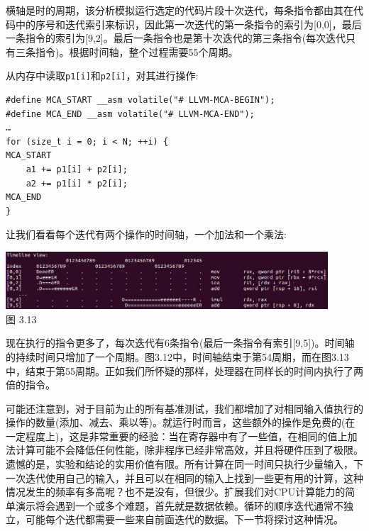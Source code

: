 横轴是时的周期，该分析模拟运行选定的代码片段十次迭代，每条指令都由其在代码中的序号和迭代索引来标识，因此第一次迭代的第一条指令的索引为[0,0]，最后一条指令的索引为[9,2]。最后一条指令也是第十次迭代的第三条指令(每次迭代只有三条指令)。根据时间轴，整个过程需要55个周期。

从内存中读取\texttt{p1[i]}和\texttt{p2[i]}，对其进行操作:

\begin{lstlisting}[style=styleCXX]
#define MCA_START __asm volatile("# LLVM-MCA-BEGIN");
#define MCA_END __asm volatile("# LLVM-MCA-END");
…
for (size_t i = 0; i < N; ++i) {
MCA_START
	a1 += p1[i] + p2[i];
	a2 += p1[i] * p2[i];
MCA_END
}
\end{lstlisting}

让我们看看每个迭代有两个操作的时间轴，一个加法和一个乘法:

\begin{center}
\includegraphics[width=0.9\textwidth]{content/1/chapter3/images/13.jpg}\\
图 3.13
\end{center}

现在执行的指令更多了，每次迭代有6条指令(最后一条指令有索引[9,5])。时间轴的持续时间只增加了一个周期。图3.12中，时间轴结束于第54周期，而在图3.13中，结束于第55周期。正如我们所怀疑的那样，处理器在同样长的时间内执行了两倍的指令。

可能还注意到，对于目前为止的所有基准测试，我们都增加了对相同输入值执行的操作的数量(添加、减去、乘以等)。就运行时而言，这些额外的操作是免费的(在一定程度上)，这是非常重要的经验：当在寄存器中有了一些值，在相同的值上加法计算可能不会降低任何性能，除非程序已经非常高效，并且将硬件压到了极限。遗憾的是，实验和结论的实用价值有限。所有计算在同一时间只执行少量输入，下一次迭代使用自己的输入，并且可以在相同的输入上找到一些更有用的计算，这种情况发生的频率有多高呢？也不是没有，但很少。扩展我们对CPU计算能力的简单演示将会遇到一个或多个难题，首先就是数据依赖。循环的顺序迭代通常不独立，可能每个迭代都需要一些来自前面迭代的数据。下一节将探讨这种情况。

















